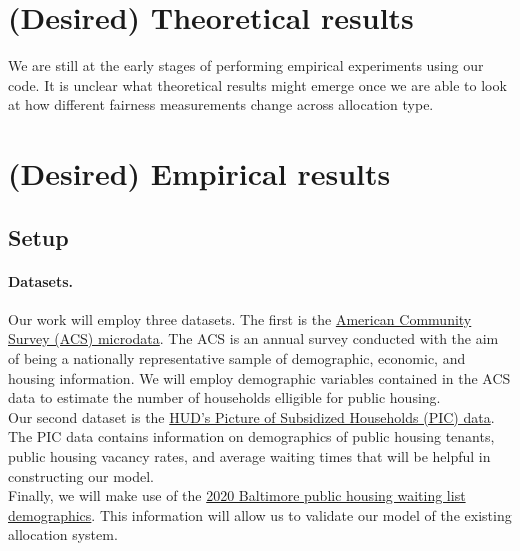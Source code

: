 \documentclass[11pt]{article}
\begin{document}
\section{(Desired) Theoretical results}
We are still at the early stages of performing empirical experiments using our code. It is unclear what theoretical results might emerge once we are able to look at how different fairness measurements change across allocation type. 

\section{(Desired) Empirical results}

\subsection{Setup}
\paragraph{Datasets.}
Our work will employ three datasets. The first is the \href{https://data.census.gov/mdat/#/search?ds=ACSPUMS5Y2021}{American Community Survey (ACS) microdata}. The ACS is an annual survey conducted with the aim of being a nationally representative sample of demographic, economic, and housing information. We will employ demographic variables contained in the ACS data to estimate the number of households elligible for public housing. \\
\newline
Our second dataset is the \href{https://www.huduser.gov/portal/datasets/assthsg.html}{HUD’s Picture of Subsidized Households (PIC) data}. The PIC data contains information on demographics of public housing tenants, public housing vacancy rates, and average waiting times that will be helpful in constructing our model. \\
\newline
Finally, we will make use of the \href{https://www.hud.gov/sites/dfiles/PIH/documents/BaltimoreFY20Report.pdf}{2020 Baltimore public housing waiting list demographics}. This information will allow us to validate our model of the existing allocation system.
\end{document}
